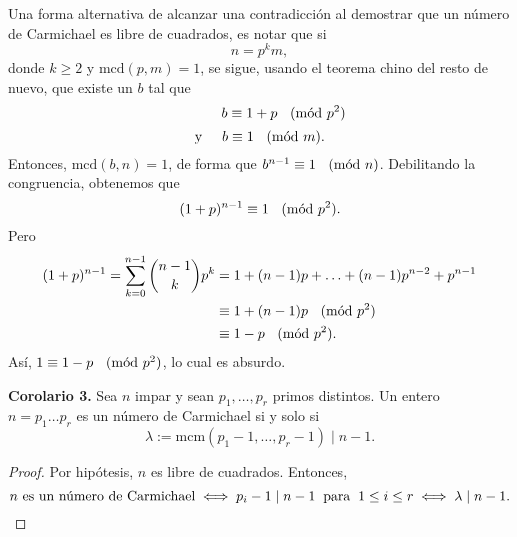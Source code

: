 \documentclass{article}
\theoremstyle{definition}
\newcommand{\Mod}[1]{\ \hspace{0.2cm} (\mathrm{m\acute{o}d}\ #1)}
\begin{document}
Una forma alternativa de alcanzar una contradicción al demostrar que un número de Carmichael es libre de cuadrados, es notar que si 
$$ n = p^{k}m, $$
donde $k \geq 2$ y $\text{mcd}(p, m) = 1$, se sigue, usando el teorema chino del resto de nuevo, que existe un $b$ tal que
$$\hspace{1.2cm} b \equiv 1+ p \Mod{p^2} $$
$$\text{y} \hspace{0.5cm} b \equiv 1 \Mod{m} .$$
Entonces, $\text{mcd}(b, n) = 1$, de forma que $b^{n-1} \equiv 1 \Mod{n}$. Debilitando la congruencia, obtenemos que
$$ (1 + p)^{n-1} \equiv 1 \Mod{p^2} .$$
Pero
\begin{equation*}
\begin{split}
(1 + p)^{n-1} = \sum_{k=0}^{n-1} \binom{n-1}{k} p^{k} &= 1 + (n-1)p + \ldots + (n-1)p^{n-2} + p^{n-1}  \\
&\equiv 1 + (n-1)p \Mod{p^{2}} \\
&\equiv 1 - p \Mod{p^{2}}.
\end{split}
\end{equation*}
Así, $ 1  \equiv 1 - p \Mod{p^{2}} $, lo cual es absurdo. 
\vspace{0.3cm}
\begin{mybox2}
\textbf{Corolario 3. } Sea $n$ impar y sean $p_{1}, \ldots , p_{r}$ primos distintos. Un entero  \\ $n = p_{1} \ldots p_{r}$ es un número de Carmichael si y solo si $$\lambda := \text{mcm}(p_{1} - 1, \ldots, p_{r} - 1) \mid n - 1 .$$
\end{mybox2}	
\begin{proof}
	Por hipótesis, $n$ es libre de cuadrados. Entonces, 
	$$ \text{$n$ es un número de Carmichael} \iff p_{i} - 1 \mid n - 1 \hspace{0.2cm}\text{para} \hspace{0.2cm} 1 \leq i \leq r \iff \lambda \mid n - 1.$$ 
\end{proof}
\end{document}
